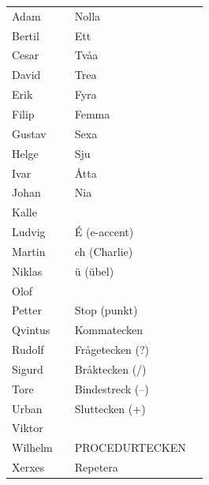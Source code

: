 \begin{table}[H]
\centering
\small
\begin{tabular}{llll}
	Adam    & \MAdam    & Nolla                  & \MNoll         \\
	Bertil  & \MBertil  & Ett                    & \MEtt          \\
	Cesar   & \MCesar   & Tvåa                   & \MTva          \\
	David   & \MDavid   & Trea                   & \MTre          \\
	Erik    & \MErik    & Fyra                   & \MFyra         \\
	Filip   & \MFilip   & Femma                  & \MFem          \\
	Gustav  & \MGustav  & Sexa                   & \MSex          \\
	Helge   & \MHelge   & Sju                    & \MSju          \\
	Ivar    & \MIvar    & Åtta                   & \MAtta         \\
	Johan   & \MJohan   & Nia                    & \MNio          \\
	Kalle   & \MKalle   &                        &                \\
	Ludvig  & \MLudvig  & É (e-accent)           & \Meaccent      \\
	Martin  & \MMartin  & ch (Charlie)           & \Mch           \\
	Niklas  & \MNiklas  & ü (übel)               & \Mubel         \\
	Olof    & \MOlof    &                        &                \\
	Petter  & \MPetter  & Stop (punkt)           & \MSTOP         \\
	Qvintus & \MQvintus & Kommatecken            & \MKomma        \\
	Rudolf  & \MRudolf  & Frågetecken (?)        & \MFragetecken  \\
	Sigurd  & \MSigurd  & Bråktecken (/)         & \MBraktecken   \\
	Tore    & \MTore    & Bindestreck (--)       & \MBindestreck  \\
	Urban   & \MUrban   & Sluttecken (+)         & \MSluttecken   \\
	Viktor  & \MViktor  &                        &                \\
	Wilhelm & \MWilhelm & PROCEDURTECKEN         &                \\
	Xerxes  & \MXerxes  & Repetera               & \MRepetera     \\

\end{tabular}
\end{table}
